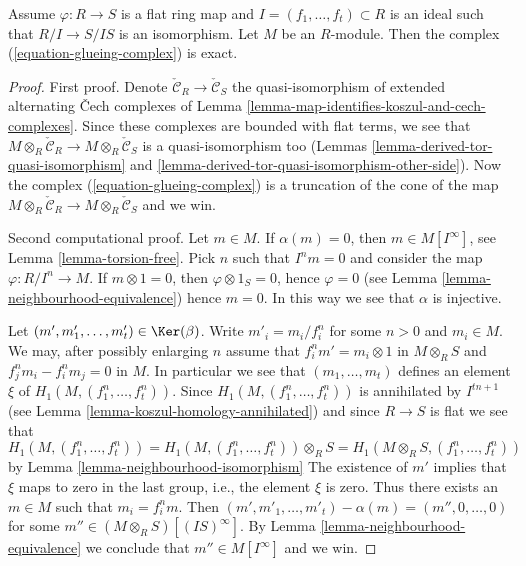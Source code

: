 \begin{lemma}
\label{lemma-recover-module-from-glueing-data}
Assume $\varphi : R \to S$ is a flat ring map and
$I = (f_1, \ldots, f_t) \subset R$ is an ideal such that
$R/I \to S/IS$ is an isomorphism.
Let $M$ be an $R$-module. Then the
complex (\ref{equation-glueing-complex})
is exact.
\end{lemma}

\begin{proof}
First proof. Denote $\check{\mathcal{C}}_R \to \check{\mathcal{C}}_S$
the quasi-isomorphism of extended alternating {\v C}ech complexes of
Lemma \ref{lemma-map-identifies-koszul-and-cech-complexes}.
Since these complexes are bounded with flat terms, we see that
$M \otimes_R \check{\mathcal{C}}_R \to M \otimes_R \check{\mathcal{C}}_S$
is a quasi-isomorphism too (Lemmas
\ref{lemma-derived-tor-quasi-isomorphism} and
\ref{lemma-derived-tor-quasi-isomorphism-other-side}). Now the complex
(\ref{equation-glueing-complex}) is a truncation of the cone
of the map
$M \otimes_R \check{\mathcal{C}}_R \to M \otimes_R \check{\mathcal{C}}_S$
and we win.

\medskip\noindent
Second computational proof.
Let $m \in M$. If $\alpha(m) = 0$, then $m \in M[I^\infty]$, see
Lemma \ref{lemma-torsion-free}. Pick $n$ such that $I^n m = 0$
and consider the map $\varphi : R/I^n \to M$.
If $m \otimes 1 = 0$, then $\varphi \otimes 1_S = 0$, hence
$\varphi = 0$ (see
Lemma \ref{lemma-neighbourhood-equivalence})
hence $m = 0$. In this way we see that $\alpha$ is injective.

\medskip\noindent
Let $(m', m'_1, \ldots, m'_t) \in \Ker(\beta)$.
Write $m'_i = m_i/f_i^n$ for some $n > 0$ and $m_i \in M$.
We may, after possibly enlarging $n$ assume that
$f_i^n m' = m_i \otimes 1$ in $M \otimes_R S$ and
$f_j^nm_i - f_i^nm_j = 0$ in $M$.
In particular we see that
$(m_1, \ldots, m_t)$ defines an element $\xi$ of
$H_1(M, (f_1^n, \ldots, f_t^n))$.
Since $H_1(M, (f_1^n, \ldots, f_t^n))$ is annihilated by $I^{tn + 1}$ (see
Lemma \ref{lemma-koszul-homology-annihilated})
and since $R \to S$ is flat we see that
$$
H_1(M, (f_1^n, \ldots, f_t^n)) =
H_1(M, (f_1^n, \ldots, f_t^n)) \otimes_R S =
H_1(M \otimes_R S, (f_1^n, \ldots, f_t^n))
$$
by
Lemma \ref{lemma-neighbourhood-isomorphism}
The existence of $m'$ implies that $\xi$ maps to zero in the last group, i.e.,
the element $\xi$ is zero. Thus there exists an $m \in M$ such that
$m_i = f_i^n m$. Then $(m', m'_1, \ldots, m'_t) - \alpha(m)
= (m'', 0, \ldots, 0)$ for some $m'' \in (M \otimes_R S)[(IS)^\infty]$.
By
Lemma \ref{lemma-neighbourhood-equivalence}
we conclude that $m'' \in M[I^\infty]$ and we win.
\end{proof}


